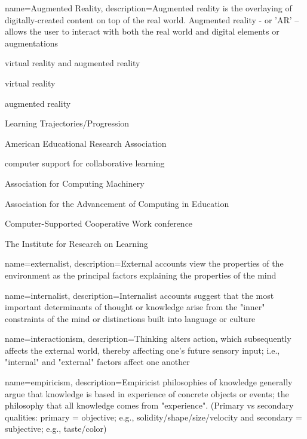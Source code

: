 {
	name={Augmented Reality},
	description={Augmented reality is the overlaying of digitally-created content on top of the real world. Augmented reality - or 'AR' – allows the user to interact with both the real world and digital elements or augmentations \parencite{noauthor_what_2019} }
}

{\gls{virtual reality} and \gls{augmented reality}}


{\gls{virtual reality}}


{\gls{augmented reality}}



{Learning Trajectories/Progression}

{American Educational Research Association}


{computer support for collaborative learning}

{Association for Computing Machinery} 

{Association for the Advancement of Computing in Education}

{Computer-Supported Cooperative Work conference}

{The Institute for Research on Learning}

 
{
	name=externalist,
	description={External accounts view the properties of the environment as the principal factors explaining the properties of the mind \parencite{bredo_philosophies_2006}}
}


{
	name=internalist,
	description={Internalist accounts suggest that the most important determinants of thought or knowledge arise from the "inner" constraints of the mind or distinctions built into language or culture \parencite{bredo_philosophies_2006}}
}


{
	name=interactionism,
	description={Thinking alters action, which subsequently affects the external world, thereby affecting one's future sensory input; i.e., "internal" and "external" factors affect one another \parencite{bredo_philosophies_2006}}
}


{
	name=empiricism,
	description={Empiricist philosophies of knowledge generally argue that knowledge is based in experience of concrete objects or events; the philosophy that all knowledge comes from "experience". (Primary vs secondary qualities: primary = objective; e.g., solidity/shape/size/velocity and secondary = subjective; e.g., taste/color) \parencite{bredo_philosophies_2006}}
}


